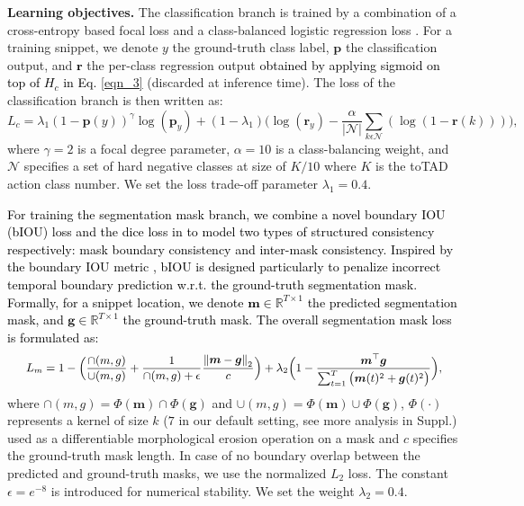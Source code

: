 \documentclass[runningheads]{llncs}
\begin{document}
\noindent\textbf{Learning objectives. } 
The classification branch is trained by a combination of a cross-entropy based focal loss and a class-balanced logistic regression loss \cite{dong2019single}. 
For a training snippet, we denote $y$ the ground-truth class label, $\bm{p}$ the classification output,
and \textcolor{black}{$\bm{r}$} the per-class regression output \textcolor{black}{obtained by applying sigmoid on top of $H_{c}$ in Eq. \eqref{eqn_3}} (discarded at inference time).
The loss of the classification branch is then written as:
\begin{equation}\label{eqn6}
 L_{c} = \lambda_{1}(1-\bm{p}(y))^{\gamma }\log(\bm{p}_y) + (1-\lambda_{1})
\big( \log(\bm{r}_y) 
- \frac{\alpha}{|\mathcal{N}|} \sum_{k\epsilon \mathcal{N}}(\log( 1-\bm{r}(k))) 
\big),   
\end{equation}
where $\gamma=2$ is a focal degree parameter,
$\alpha=10$ is a class-balancing weight,
and $\mathcal{N}$ specifies a set of hard negative classes
at size of $K/10$ where $K$ is the toTAD action class number.
We set the loss trade-off parameter $\lambda_{1}=0.4$. 

\textcolor{black}{For training the segmentation mask branch, we combine a novel boundary IOU (bIOU) loss and the dice loss in \cite{milletari2016v} to model two types of structured consistency respectively: mask boundary consistency and inter-mask consistency. Inspired by the boundary IOU metric \cite{cheng2021boundary},
bIOU is designed particularly to penalize incorrect temporal boundary prediction w.r.t. the ground-truth segmentation mask.
Formally, for a snippet location, 
we denote $\bm{m} \in \mathbb{R}^{T\times 1}$ the predicted segmentation mask, and
$\bm{g} \in \mathbb{R}^{T\times 1}$ the ground-truth mask.
The overall segmentation mask loss is formulated as:
} 
\begin{equation}
\centering \small
\begin{aligned}
    L_m = 1 - \Big(\frac{ \cap(m,g)}{\cup(m,g)} + \frac{1}{\cap(m,g) + \epsilon} \frac{\left \| \bm{m} - \bm{g} \right \|_{2}}{c}\Big)
      +  
    \lambda_2
    \Big( 1 - 
    \frac{\bm{m}^\top \bm{g}}
    {\sum_{t=1}^{T} \big(\bm{m}(t)^2 + \bm{g}(t)^2 \big)} 
    \Big),
\end{aligned}\label{eq:mask_loss}
\end{equation}
where $\cap(m,g) = \Phi(\bm{m}) \cap \Phi(\bm{g})$ and $\cup(m,g) = \Phi(\bm{m}) \cup \Phi(\bm{g})$, $\Phi(\cdot)$ represents a kernel of size $k$ ($7$ in our default setting, see more analysis in Suppl.) used as a differentiable morphological erosion operation \cite{riba2020kornia} on a mask and $c$ specifies the ground-truth mask length.
In case of no boundary overlap between the predicted and ground-truth masks, 
we use the normalized $L_2$ loss.
The constant $\epsilon=e^{-8}$ is introduced for numerical stability.
We set the weight $\lambda_2 = 0.4$.
\end{document}
